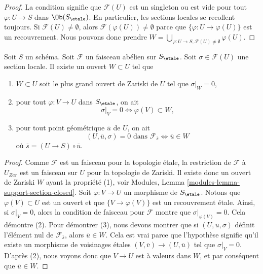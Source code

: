 \begin{proof}
La condition signifie que $\mathcal{F}(U)$ est un singleton ou est
vide pour tout $\varphi : U \to S$ dans $\Ob(S_\etale)$.
En particulier, les sections locales se recollent toujours. Si
$\mathcal{F}(U) \not = \emptyset$, alors
$\mathcal{F}(\varphi(U)) \not = \emptyset$ parce que
$\{\varphi : U \to \varphi(U)\}$ est un recouvrement.
Nous pouvons donc prendre
$W = \bigcup_{\varphi : U \to S, \mathcal{F}(U) \not = \emptyset} \varphi(U)$.
\end{proof}

\begin{lemma}
\label{lemma-zero-over-image}
Soit $S$ un sch\'ema.
Soit $\mathcal{F}$ un faisceau ab\'elien sur $S_\etale$.
Soit $\sigma \in \mathcal{F}(U)$ une section locale.
Il existe un ouvert $W \subset U$ tel que
\begin{enumerate}
\item $W \subset U$ soit le plus grand ouvert de Zariski de $U$ tel
que $\sigma|_W = 0$,
\item pour tout $\varphi : V \to U$ dans $S_\etale$, on ait
$$
\sigma|_V = 0 \Leftrightarrow \varphi(V) \subset W,
$$
\item pour tout point g\'eom\'etrique $\overline{u}$ de $U$, on ait
$$
(U, \overline{u}, \sigma) = 0\text{ dans }\mathcal{F}_{\overline{s}}
\Leftrightarrow
\overline{u} \in W
$$
o\`u $\overline{s} = (U \to S) \circ \overline{u}$.
\end{enumerate}
\end{lemma}

\begin{proof}
Comme $\mathcal{F}$ est un faisceau pour la topologie \'etale, la restriction de
$\mathcal{F}$ \`a $U_{Zar}$ est un faisceau sur $U$ pour la topologie de Zariski.
Il existe donc un ouvert de Zariski $W$ ayant la propri\'et\'e (1), voir
Modules, Lemma \ref{modules-lemma-support-section-closed}. Soit
$\varphi : V \to U$ un morphisme de $S_\etale$. Notons que
$\varphi(V) \subset U$ est un ouvert et que
$\{V \to \varphi(V)\}$ est un recouvrement \'etale. Ainsi, si
$\sigma|_V = 0$, alors la condition de faisceau pour $\mathcal{F}$ montre
que $\sigma|_{\varphi(V)} = 0$. Cela d\'emontre (2).
Pour d\'emontrer (3), nous devons montrer que si $(U, \overline{u}, \sigma)$
d\'efinit l'\'el\'ement nul de $\mathcal{F}_{\overline{s}}$, alors
$\overline{u} \in W$. Cela est vrai parce que l'hypoth\`ese signifie
qu'il existe un morphisme de voisinages \'etales
$(V, \overline{v}) \to (U, \overline{u})$ tel que
$\sigma|_V = 0$. D'apr\`es (2), nous voyons donc que $V \to U$ est \`a valeurs dans $W$, et
par cons\'equent que $\overline{u} \in W$.
\end{proof}

